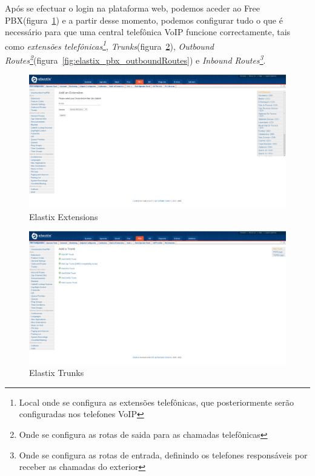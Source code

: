 Após se efectuar o login na plataforma web, podemos aceder ao Free PBX(figura~\ref{fig:elastix_pbx_extensions}) e a partir
desse momento, podemos configurar tudo o que é necessário para que uma central telefônica VoIP funcione correctamente, tais como \emph{extensões telefônicas\footnote{Local onde se configura as extensões telefônicas, que posteriormente serão configuradas nos telefones VoIP}}, \emph{Trunks}(figura~\ref{fig:elastix_pbx_trunk}), \emph{Outbound Routes\footnote{Onde se configura as rotas de saida para as chamadas telefônicas}}(figura~\ref{fig:elastix_pbx_outboundRoutes}) e \emph{Inbound Routes\footnote{Onde se configura as rotas de entrada, definindo os telefones responsáveis por receber as chamadas do exterior}}.

\begin{figure}[H]
    \begin{center}
        \includegraphics[width=13cm]{include/img/elastix_pbx_extensions.png}
    \end{center}
    \caption{Elastix Extensions}
    \label{fig:elastix_pbx_extensions}
\end{figure}

\begin{figure}[H]
    \begin{center}
        \includegraphics[width=13cm]{include/img/elastix_pbx_trunk.png}
    \end{center}
    \caption{Elastix Trunks}
    \label{fig:elastix_pbx_trunk}
\end{figure}

